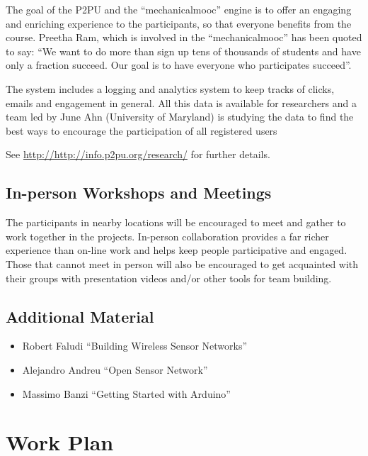 \documentclass[a4paper,oneside]{book}   %
\begin{document}
The goal of the P2PU and the ``mechanicalmooc'' engine is to offer an engaging and enriching experience to the participants, so that everyone benefits from the course.
Preetha Ram, which is involved in the ``mechanicalmooc'' has been quoted to say: ``We want to do more than sign up tens of thousands of students and have only a fraction succeed. Our goal is to have everyone who participates succeed''.

The system includes a logging and analytics system to keep tracks of clicks, emails and engagement in general.
All this data is available for researchers and a team led by June Ahn (University of Maryland) is studying the data to find the best ways to encourage the participation of all registered users \cite{ahn2013dop}

See \url{http://http://info.p2pu.org/research/} for further details.

\subsection{In-person Workshops and Meetings}

The participants in nearby locations will be encouraged to meet and gather to work together in the projects.
In-person collaboration provides a far richer experience than on-line work and helps keep people participative and engaged.
Those that cannot meet in person will also be encouraged to get acquainted with their groups with presentation videos and/or other tools for team building.

\subsection{Additional Material}

\begin{itemize}
\item Robert Faludi ``Building Wireless Sensor Networks'' \cite{faludi2010bws}
\item Alejandro Andreu ``Open Sensor Network'' \cite{andreu2013osn}
\item Massimo Banzi ``Getting Started with Arduino'' \cite{banzi2009gsa}
\end{itemize}



\section{Work Plan}
\end{document}
